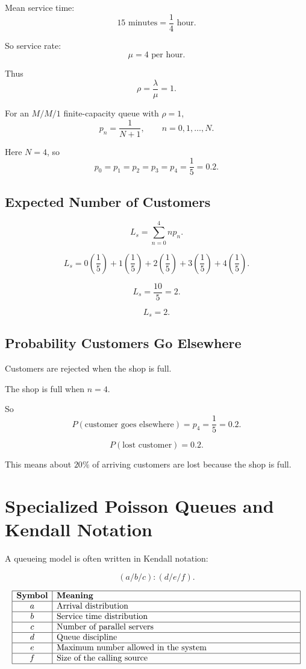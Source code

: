 \documentclass[12pt]{article}
\begin{document}
Mean service time:
\[
15\text{ minutes}=\frac14\text{ hour}.
\]

So service rate:
\[
\mu=4\text{ per hour}.
\]

Thus
\[
\rho=\frac{\lambda}{\mu}=1.
\]

For an \(M/M/1\) finite-capacity queue with \(\rho=1\),
\[
p_n=\frac{1}{N+1},\qquad n=0,1,\ldots,N.
\]

Here \(N=4\), so
\[
\boxed{
p_0=p_1=p_2=p_3=p_4=\frac15=0.2.
}
\]

\subsection*{Expected Number of Customers}

\[
L_s=\sum_{n=0}^{4}np_n.
\]

\[
L_s=0\left(\frac15\right)+1\left(\frac15\right)+2\left(\frac15\right)+3\left(\frac15\right)+4\left(\frac15\right).
\]

\[
L_s=\frac{10}{5}=2.
\]

\[
\boxed{L_s=2.}
\]

\subsection*{Probability Customers Go Elsewhere}

Customers are rejected when the shop is full.

The shop is full when \(n=4\).

So
\[
P(\text{customer goes elsewhere})=p_4=\frac15=0.2.
\]

\[
\boxed{P(\text{lost customer})=0.2.}
\]

This means about \(20\%\) of arriving customers are lost because the shop is full.

\section{Specialized Poisson Queues and Kendall Notation}

A queueing model is often written in Kendall notation:

\[
\boxed{(a/b/c):(d/e/f).}
\]

\[
\begin{array}{|c|p{10cm}|}
\hline
\textbf{Symbol} & \textbf{Meaning}\\
\hline
a & Arrival distribution\\
\hline
b & Service time distribution\\
\hline
c & Number of parallel servers\\
\hline
d & Queue discipline\\
\hline
e & Maximum number allowed in the system\\
\hline
f & Size of the calling source\\
\hline
\end{array}
\]
\end{document}
